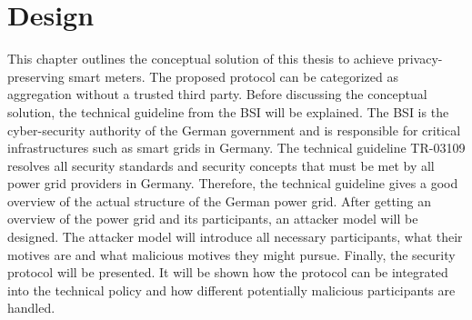 \chapter{Design}
\label{sec:design}




This chapter outlines the conceptual solution of this thesis to achieve privacy-preserving smart meters. The proposed protocol can be categorized as aggregation without a trusted third party. Before discussing the conceptual solution, the technical guideline from the BSI will be explained. The BSI is the cyber-security authority of the German government and is responsible for critical infrastructures such as smart grids in Germany.  The technical guideline TR-03109 resolves all security standards and security concepts that must be met by all power grid providers in Germany. Therefore, the technical guideline gives a good overview of the actual structure of the German power grid. After getting an overview of the power grid and its participants, an attacker model will be designed. The attacker model will introduce all necessary participants, what their motives are and what malicious motives they might pursue. Finally, the security protocol will be presented. It will be shown how the protocol can be integrated into the technical policy and how different potentially malicious participants are handled.
